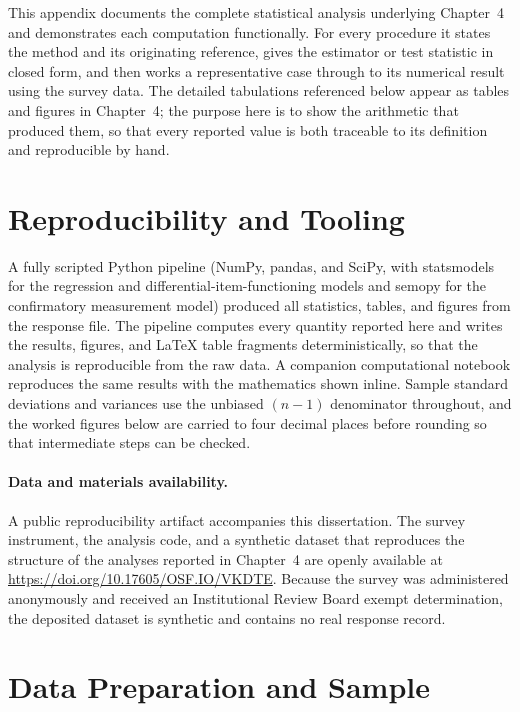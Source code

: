 

\label{appendix:statistical-methods}

This appendix documents the complete statistical analysis underlying Chapter~4 and demonstrates each computation functionally. For every procedure it states the method and its originating reference, gives the estimator or test statistic in closed form, and then works a representative case through to its numerical result using the survey data. The detailed tabulations referenced below appear as tables and figures in Chapter~4; the purpose here is to show the arithmetic that produced them, so that every reported value is both traceable to its definition and reproducible by hand.

\section{Reproducibility and Tooling}\label{sec:appb-reproducibility}

A fully scripted Python pipeline (NumPy, pandas, and SciPy, with statsmodels for the regression and differential-item-functioning models and semopy for the confirmatory measurement model) produced all statistics, tables, and figures from the response file. The pipeline computes every quantity reported here and writes the results, figures, and \LaTeX{} table fragments deterministically, so that the analysis is reproducible from the raw data. A companion computational notebook reproduces the same results with the mathematics shown inline. Sample standard deviations and variances use the unbiased $(n-1)$ denominator throughout, and the worked figures below are carried to four decimal places before rounding so that intermediate steps can be checked.

\paragraph{Data and materials availability.} A public reproducibility artifact accompanies this dissertation. The survey instrument, the analysis code, and a synthetic dataset that reproduces the structure of the analyses reported in Chapter~4 are openly available at \url{https://doi.org/10.17605/OSF.IO/VKDTE}. Because the survey was administered anonymously and received an Institutional Review Board exempt determination, the deposited dataset is synthetic and contains no real response record.

\section{Data Preparation and Sample}

